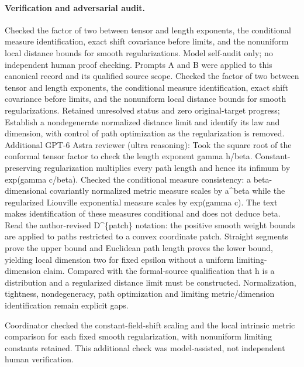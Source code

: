 \documentclass[11pt]{article}
\begin{document}
\paragraph{Verification and adversarial audit.}
Checked the factor of two between tensor and length exponents, the conditional measure identification, exact shift covariance before limits, and the nonuniform local distance bounds for smooth regularizations. Model self-audit only; no independent human proof checking. Prompts A and B were applied to this canonical record and its qualified source scope. Checked the factor of two between tensor and length exponents, the conditional measure identification, exact shift covariance before limits, and the nonuniform local distance bounds for smooth regularizations. Retained unresolved status and zero original-target progress; Establish a nondegenerate normalized distance limit and identify its law and dimension, with control of path optimization as the regularization is removed. Additional GPT-6 Astra reviewer (ultra reasoning): Took the square root of the conformal tensor factor to check the length exponent gamma h/beta. Constant-preserving regularization multiplies every path length and hence its infimum by exp(gamma c/beta). Checked the conditional measure consistency: a beta-dimensional covariantly normalized metric measure scales by a\textasciicircum{}beta while the regularized Liouville exponential measure scales by exp(gamma c). The text makes identification of these measures conditional and does not deduce beta. Read the author-revised D\textasciicircum{}\{patch\} notation: the positive smooth weight bounds are applied to paths restricted to a convex coordinate patch. Straight segments prove the upper bound and Euclidean path length proves the lower bound, yielding local dimension two for fixed epsilon without a uniform limiting-dimension claim. Compared with the formal-source qualification that h is a distribution and a regularized distance limit must be constructed. Normalization, tightness, nondegeneracy, path optimization and limiting metric/dimension identification remain explicit gaps.

Coordinator checked the constant-field-shift scaling and the local intrinsic metric comparison for each fixed smooth regularization, with nonuniform limiting constants retained. This additional check was model-assisted, not independent human verification.
\end{document}
